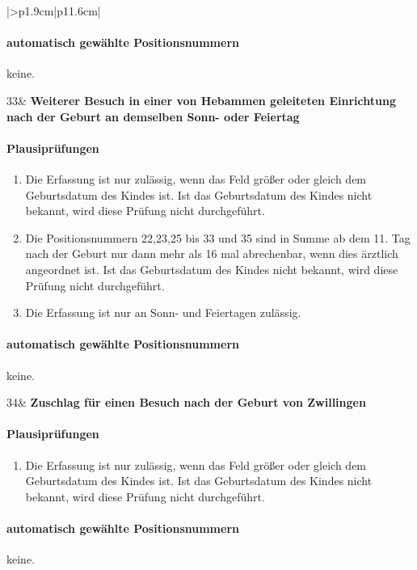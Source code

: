 \begin{mpsupertabular}{|>{\centering}p{1.9cm}|p{11.6cm}|}
\paragraph{automatisch gewählte Positionsnummern}
keine.
\\ \hline


33&
\textbf{Weiterer Besuch in einer von Hebammen geleiteten Einrichtung
nach der Geburt an demselben Sonn- oder Feiertag}
\paragraph{Plausiprüfungen}
\begin{enumerate}
\item
Die Erfassung ist nur zulässig, wenn das Feld  größer 
oder gleich dem Geburtsdatum des Kindes ist. Ist das Geburtsdatum des
Kindes nicht bekannt, wird diese Prüfung nicht durchgeführt.
\item
Die Positionsnummern 22,23,25 bis 33 und 35 sind in Summe ab dem 11. Tag 
nach der Geburt nur dann mehr 
als 16 mal abrechenbar, wenn dies ärztlich angeordnet ist.
 Ist das Geburtsdatum des
Kindes nicht bekannt, wird diese Prüfung nicht durchgeführt.
\item
Die Erfassung ist nur an Sonn- und Feiertagen zulässig.
\end{enumerate}
\paragraph{automatisch gewählte Positionsnummern}
keine.
\\ \hline


34&
\textbf{Zuschlag für einen Besuch nach der Geburt von Zwillingen}
\paragraph{Plausiprüfungen}
\begin{enumerate}
\item
Die Erfassung ist nur zulässig, wenn das Feld  größer 
oder gleich dem Geburtsdatum des Kindes ist. Ist das Geburtsdatum des
Kindes nicht bekannt, wird diese Prüfung nicht durchgeführt.
\end{enumerate}
\paragraph{automatisch gewählte Positionsnummern}
keine.
\\ \hline



\end{mpsupertabular}
